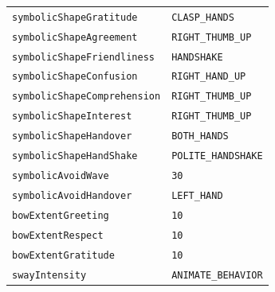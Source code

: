 \documentclass{CSSRforAfrica}
\begin{document}
\begin{table}[H]
\begin{tabular}{l l}
{\footnotesize \verb+symbolicShapeGratitude+} 	                          & {\footnotesize \verb+CLASP_HANDS+} \vspace{-1.5mm}\\
{\footnotesize \verb+symbolicShapeAgreement+}                           & {\footnotesize \verb+RIGHT_THUMB_UP+} \vspace{-1.5mm}\\
{\footnotesize \verb+symbolicShapeFriendliness+}                          & {\footnotesize \verb+HANDSHAKE+ } \vspace{-1.5mm}\\
{\footnotesize \verb+symbolicShapeConfusion+} 	                          & {\footnotesize \verb+RIGHT_HAND_UP+ } \vspace{-1.5mm}\\
{\footnotesize \verb+symbolicShapeComprehension+} 	                  & {\footnotesize \verb+RIGHT_THUMB_UP+ } \vspace{-1.5mm}\\
{\footnotesize \verb+symbolicShapeInterest+} 	                          & {\footnotesize \verb+RIGHT_THUMB_UP+ } \vspace{-1.5mm}\\
{\footnotesize \verb+symbolicShapeHandover+} 	                          & {\footnotesize \verb+BOTH_HANDS+} \vspace{-1.5mm}\\
{\footnotesize \verb+symbolicShapeHandShake+} 	                  & {\footnotesize \verb+POLITE_HANDSHAKE+} \vspace{-1.5mm}\\
{\footnotesize \verb+symbolicAvoidWave+} 	                                  & {\footnotesize \verb+30+  } \vspace{-1.5mm}\\
{\footnotesize \verb+symbolicAvoidHandover+} 	                          & {\footnotesize \verb+LEFT_HAND+} \vspace{-1.5mm}\\
{\footnotesize \verb+bowExtentGreeting+} 	                                  & {\footnotesize \verb+10+} \vspace{-1.5mm}\\
{\footnotesize \verb+bowExtentRespect+} 	                                  & {\footnotesize \verb+10+} \vspace{-1.5mm}\\
{\footnotesize \verb+bowExtentGratitude+} 	                                  & {\footnotesize \verb+10+} \vspace{-1.5mm}\\
{\footnotesize \verb+swayIntensity+} 	                                         & {\footnotesize \verb+ANIMATE_BEHAVIOR+} \vspace{-1.5mm}\\
\end{tabular}
\vspace{-5mm}
\end{table}
  
\end{document}

